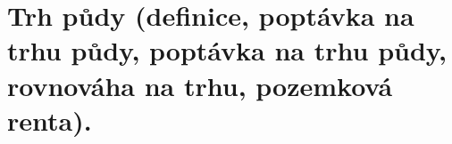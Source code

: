 \clearpage
\section{Trh půdy (definice, poptávka na trhu půdy, poptávka na trhu půdy, rovnováha na trhu,
pozemková renta).}